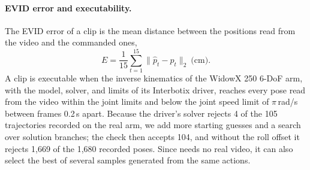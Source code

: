 \paragraph{EVID error and executability.}
The EVID error of a clip is the mean distance between the positions read from the video and the commanded ones,
\begin{equation}
  E = \frac{1}{15}\sum_{t=1}^{15} \lVert \hat p_t - p_t \rVert_2 \ \text{(cm)}.
  \label{eq:idmscore}
\end{equation}
A clip is executable when the inverse kinematics of the WidowX 250 6-DoF arm, with the model, solver, and limits of its Interbotix driver, reaches every pose read from the video within the joint limits and below the joint speed limit of $\pi$\,rad/s between frames 0.2\,s apart.
Because the driver's solver rejects 4 of the 105 trajectories recorded on the real arm, we add more starting guesses and a search over solution branches; the check then accepts 104, and without the roll offset it rejects 1,669 of the 1,680 recorded poses.
Since \ours{} needs no real video, it can also select the best of several samples generated from the same actions.


